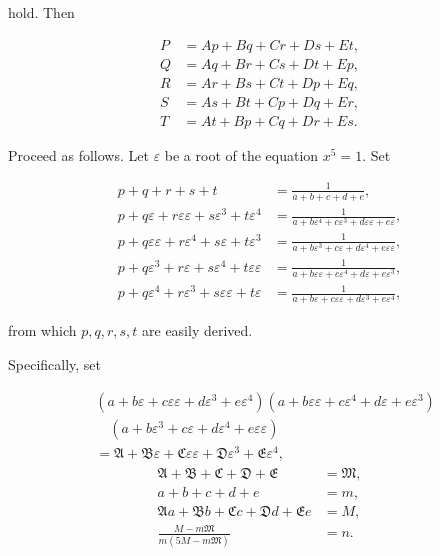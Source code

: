 
\noindent hold. Then

\[
\begin{aligned}
P &= Ap + Bq + Cr + Ds + Et,\\[3pt]
Q &= Aq + Br + Cs + Dt + Ep,\\[3pt]
R &= Ar + Bs + Ct + Dp + Eq,\\[3pt]
S &= As + Bt + Cp + Dq + Er,\\[3pt]
T &= At + Bp + Cq + Dr + Es.
\end{aligned}
\]

Proceed as follows. Let $\varepsilon$ be a root of the
equation $x^5=1$. Set

\[
\begin{aligned}
p+q+r+s+t &= \frac{1}{a+b+c+d+e},\\[3pt]
p+q\varepsilon+r\varepsilon\varepsilon+s\varepsilon^3+t\varepsilon^4
  &= \frac{1}{a+b\varepsilon^4+c\varepsilon^3+d\varepsilon\varepsilon+e\varepsilon},\\[3pt]
p+q\varepsilon\varepsilon+r\varepsilon^4+s\varepsilon+t\varepsilon^3
  &= \frac{1}{a+b\varepsilon^3+c\varepsilon+d\varepsilon^4+e\varepsilon\varepsilon},\\[3pt]
p+q\varepsilon^3+r\varepsilon+s\varepsilon^4+t\varepsilon\varepsilon
  &= \frac{1}{a+b\varepsilon\varepsilon+c\varepsilon^4+d\varepsilon+e\varepsilon^3},\\[3pt]
p+q\varepsilon^4+r\varepsilon^3+s\varepsilon\varepsilon+t\varepsilon
  &= \frac{1}{a+b\varepsilon+c\varepsilon\varepsilon+d\varepsilon^3+e\varepsilon^4},
\end{aligned}
\]

\noindent from which $p, q, r, s, t$ are easily derived.

Specifically, set

\[
\begin{aligned}
&(a+b\varepsilon+c\varepsilon\varepsilon+d\varepsilon^3+e\varepsilon^4)
(a+b\varepsilon\varepsilon+c\varepsilon^4+d\varepsilon+e\varepsilon^3)\\
&\quad(a+b\varepsilon^3+c\varepsilon+d\varepsilon^4+e\varepsilon\varepsilon)
\\
&= \mathfrak{A}+\mathfrak{B}\varepsilon+\mathfrak{C}\varepsilon\varepsilon
  +\mathfrak{D}\varepsilon^3+\mathfrak{E}\varepsilon^4,
\end{aligned}
\]
\[
\begin{aligned}
\mathfrak{A}+\mathfrak{B}+\mathfrak{C}+\mathfrak{D}+\mathfrak{E} &= \mathfrak{M},\\[3pt]
a+b+c+d+e &= m,\\[3pt]
\mathfrak{A}a+\mathfrak{B}b+\mathfrak{C}c+\mathfrak{D}d+\mathfrak{E}e &= M,\\[3pt]
\frac{M-m\mathfrak{M}}{m(5M-m\mathfrak{M})} &= n.
\end{aligned}
\]


